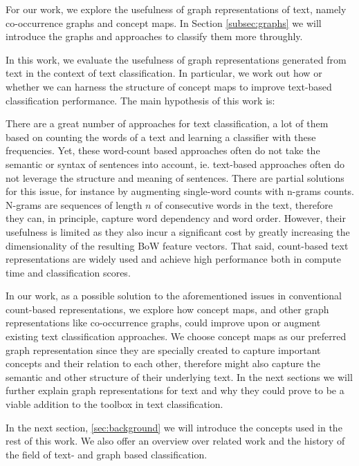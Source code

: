 For our work, we explore the usefulness of graph representations of text, namely co-occurrence graphs and concept maps.
In Section \ref{subsec:graphs} we will introduce the graphs and approaches to classify them more throughly.

In this work, we evaluate the usefulness of graph representations generated from text in the context of text classification. In particular, we work out how or whether we can harness the structure of concept maps to improve text-based classification performance.
The main hypothesis of this work is:
\begin{quote}
\hypothesis
\end{quote}

There are a great number of approaches for text classification, a lot of them based on counting the words of a text and learning a classifier with these frequencies.
Yet, these word-count based approaches often do not take the semantic or syntax of sentences into account, ie. text-based approaches often do not leverage the structure and meaning of sentences.
There are partial solutions for this issue, for instance by augmenting single-word counts with n-grams \cite[p.~191]{Manning2000} counts.
N-grams are sequences of length $n$ of consecutive words in the text, therefore they can, in principle, capture word dependency and word order.
However, their usefulness is limited as they also incur a significant cost by greatly increasing the dimensionality of the resulting BoW feature vectors.
That said, count-based text representations are widely used and achieve high performance both in compute time and classification scores.

In our work, as a possible solution to the aforementioned issues in conventional count-based representations, we explore how concept maps, and other graph representations like co-occurrence graphs, could improve upon or augment existing text classification approaches.
We choose concept maps as our preferred graph representation since they are specially created to capture important concepts and their relation to each other, therefore might also capture the semantic and other structure of their underlying text.
In the next sections we will further explain graph representations for text and why they could prove to be a viable addition to the toolbox in text classification.

In the next section, \ref{sec:background}  we will introduce the concepts used in the rest of this work.
We also offer an overview over related work and the history of the field of text- and graph based classification.

